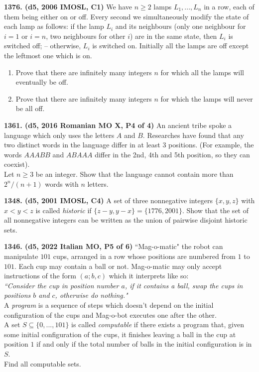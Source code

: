 \documentclass{article}
\begin{document}
        \textbf{1376. (\color{red}d5\color{black}, 2006 IMOSL, C1)} We have $ n \geq 2$ lamps $ L_{1}, . . . ,L_{n}$ in a row, each of them being either on or off. Every second we simultaneously modify the state of each lamp as follows: if the lamp $ L_{i}$ and its neighbours (only one neighbour for $ i = 1$ or $ i = n$, two neighbours for other $ i$) are in the same state, then $ L_{i}$ is switched off; – otherwise, $ L_{i}$ is switched on.
        Initially all the lamps are off except the leftmost one which is on.
        \begin{enumerate}
                \item Prove that there are infinitely many integers $ n$ for which all the lamps will eventually be off.
                \item Prove that there are infinitely many integers $ n$ for which the lamps will never be all off.
        \end{enumerate}

        \textbf{1361. (\color{red}d5\color{black}, 2016 Romanian MO X, P4 of 4)} An ancient tribe spoke a language which only uses the letters $A$ and $B$. Researches have found that any two distinct words in the language differ in at least $3$ positions. (For example, the words $AAABB$ and $ABAAA$ differ in the 2nd, 4th and 5th position, so they can coexist).\\ Let $n\ge3$ be an integer. Show that the language cannot contain more than $2^n/(n+1)$ words with $n$ letters.

        \textbf{1348. (\color{red}d5\color{black}, 2001 IMOSL, C4)} A set of three nonnegative integers $\{x,y,z\}$ with $x < y < z$ is called \emph{historic} if $\{z-y,y-x\} = \{1776,2001\}$. Show that the set of all nonnegative integers can be written as the union of pairwise disjoint historic sets.

        \textbf{1346. (\color{red}d5\color{black}, 2022 Italian MO, P5 of 6)} ``Mag-o-matic" the robot can manipulate $101$ cups, arranged in a row whose positions are numbered from $1$ to $101$. Each cup may contain a ball or not. Mag-o-matic may only accept instructions of the form $(a;b,c)$ which it interprets like so:\\
        \textit{``Consider the cup in position number $a$, if it contains a ball, swap the cups in positions $b$ and $c$, otherwise do nothing."}\\
        A \emph{program} is a sequence of steps which doesn't depend on the initial configuration of the cups and Mag-o-bot executes one after the other.\\
        A set $S \subseteq \{0,...,101\}$ is called \emph{computable} if there exists a program that, given some initial configuration of the cups, it finishes leaving a ball in the cup at position $1$ if and only if the total number of balls in the initial configuration is in $S$.\\
        Find all computable sets.
\end{document}
